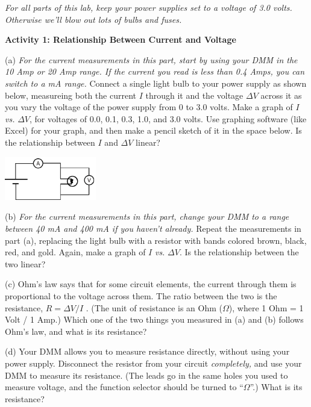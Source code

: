 \begin{newboxed}
\textit{For all parts of this lab, keep your power supplies set to a voltage of 3.0 volts.  Otherwise we'll blow out lots of bulbs and fuses.}
\end{newboxed}

\vspace{0.1 in}
\textbf{Activity 1: Relationship Between Current and Voltage}

(a) \textit{For the current measurements in this part, start by using your DMM in the 10 Amp or 20 Amp range.  If the current you read is less than 0.4 Amps, you can switch to a mA range.} Connect a single light bulb to your power supply as shown below, measureing both the current $I$ through it and the voltage $\Delta V$ across it as you vary the voltage of the power supply from 0 to 3.0 volts.  Make a graph of $I$ \textit{vs.} $\Delta V$, for voltages of 0.0, 0.1, 0.3, 1.0, and 3.0 volts.  Use graphing software (like Excel) for your graph, and then make a pencil sketch of it in the space below.  Is the relationship between $I$ and $\Delta V$ linear?

\hspace{0.5in}\includegraphics[width=0.3\textwidth]{electric_circuits2/circ_diag1.eps}
\answerspace{0.5 in}

(b) \textit{For the current measurements in this part, change your DMM to a range between 40 mA and 400 mA if you haven't already.} Repeat the measurements in part (a), replacing the light bulb with a resistor with bands colored brown, black, red, and gold.  Again, make a graph of $I$ \textit{vs.} $\Delta V$.  Is the relationship between the two linear?
\answerspace{1 in}

\newpage
(c) Ohm's law says that for some circuit elements, the current through them is proportional to the voltage across them.  The ratio between the two is the resistance, $R=\Delta V / I$ .  (The unit of resistance is an Ohm ($\Omega$), where 1 Ohm = 1 Volt / 1 Amp.)  Which one of the two things you measured in (a) and (b) follows Ohm's law, and what is its resistance?
\answerspace{0.7 in}

(d) Your DMM allows you to measure resistance directly, without using your power supply.  Disconnect the resistor from your circuit \textit{completely,} and use your DMM to measure its resistance.  (The leads go in the same holes you used to measure voltage, and the function selector should be turned to ``$\Omega$''.)  What is its resistance?
\answerspace{0.5 in}

